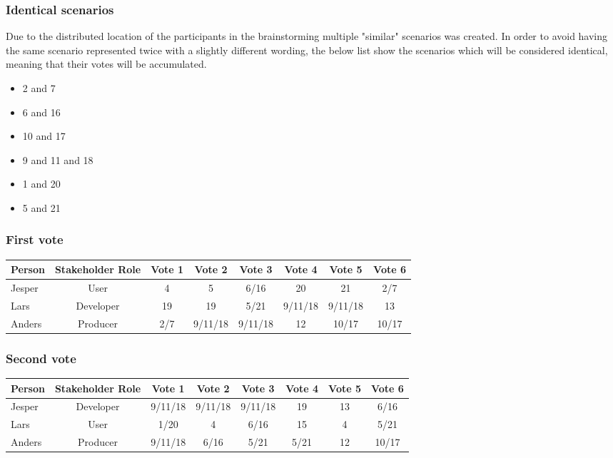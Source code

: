 \documentclass[a4paper,10pt]{article}
\begin{document}
\subsubsection{Identical scenarios}

Due to the distributed location of the participants in the brainstorming multiple "similar" scenarios was created. In order to avoid having the same scenario represented twice with a slightly different wording, the below list show the scenarios which will be considered identical, meaning that their votes will be accumulated.
\begin{itemize}
\item 2 and 7
\item 6 and 16
\item 10 and 17
\item 9 and 11 and 18
\item 1 and 20
\item 5 and 21
\end{itemize}

\subsubsection{First vote}

\begin{tabular}{|l|c|c|c|c|c|c|c|}
\hline
Person & Stakeholder Role & Vote 1 & Vote 2 & Vote 3 & Vote 4 & Vote 5 & Vote 6\\
\hline
Jesper&User&4&5&6/16&20&21&2/7\\
Lars&Developer&19&19&5/21&9/11/18&9/11/18&13\\
Anders&Producer&2/7&9/11/18&9/11/18&12&10/17&10/17\\
\hline
\end{tabular}

\subsubsection{Second vote}

\begin{tabular}{|l|c|c|c|c|c|c|c|}
\hline
Person & Stakeholder Role & Vote 1 & Vote 2 & Vote 3 & Vote 4 & Vote 5 & Vote 6\\
\hline
Jesper&Developer&9/11/18&9/11/18&9/11/18&19&13&6/16\\
Lars&User&1/20&4&6/16&15&4&5/21\\
Anders&Producer&9/11/18&6/16&5/21&5/21&12&10/17\\
\hline
\end{tabular}
\end{document}
